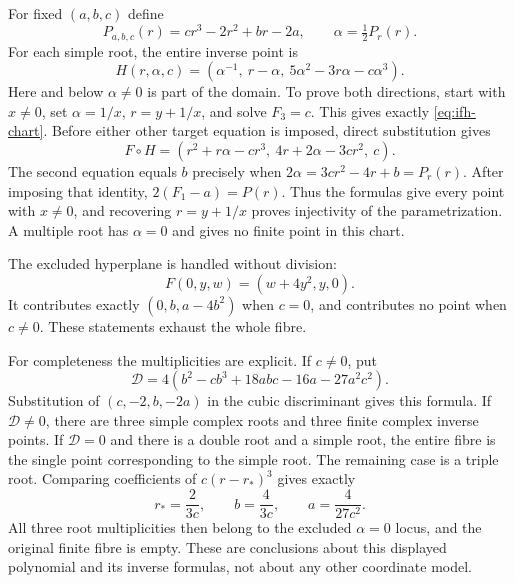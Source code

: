 For fixed $(a,b,c)$ define
\[
 P_{a,b,c}(r)=cr^3-2r^2+br-2a,\qquad
 \alpha=\tfrac12 P_r(r).
\]
For each simple root, the entire inverse point is
\begin{equation}
 H(r,\alpha,c)=
 \left(\alpha^{-1},\ r-\alpha,\
       5\alpha^2-3r\alpha-c\alpha^3\right).
 \label{eq:ifh-chart}
\end{equation}
Here and below $\alpha\ne0$ is part of the domain. To prove both directions,
start with $x\ne0$, set $\alpha=1/x$, $r=y+1/x$, and solve $F_3=c$.
This gives exactly \eqref{eq:ifh-chart}. Before either other target equation
is imposed, direct substitution gives
\begin{equation}
 F\circ H=
 \left(r^2+r\alpha-cr^3,\ 4r+2\alpha-3cr^2,\ c\right).
 \label{eq:ifh-target-chart}
\end{equation}
The second equation equals $b$ precisely when
$2\alpha=3cr^2-4r+b=P_r(r)$. After imposing that identity,
$2(F_1-a)=P(r)$. Thus the formulas give every point with $x\ne0$,
and recovering $r=y+1/x$ proves injectivity of the parametrization.
A multiple root has $\alpha=0$ and gives no finite point in this chart.

The excluded hyperplane is handled without division:
\[
 F(0,y,w)=(w+4y^2,y,0).
\]
It contributes exactly $(0,b,a-4b^2)$ when $c=0$, and contributes no
point when $c\ne0$. These statements exhaust the whole fibre.

For completeness the multiplicities are explicit. If $c\ne0$, put
\[
 \mathscr D=4(b^2-cb^3+18abc-16a-27a^2c^2).
\]
Substitution of $(c,-2,b,-2a)$ in the cubic discriminant gives this
formula. If $\mathscr D\ne0$, there are three simple complex roots and
three finite complex inverse points. If $\mathscr D=0$ and there is a
double root and a simple root, the entire fibre is the single point
corresponding to the simple root. The remaining case is a triple root.
Comparing coefficients of $c(r-r_*)^3$ gives exactly
\begin{equation}
 r_*=\frac{2}{3c},\qquad
 b=\frac4{3c},\qquad a=\frac4{27c^2}. \label{eq:ifh-triple}
\end{equation}
All three root multiplicities then belong to the excluded $\alpha=0$
locus, and the original finite fibre is empty.
These are conclusions about this displayed polynomial and its inverse
formulas, not about any other coordinate model.

